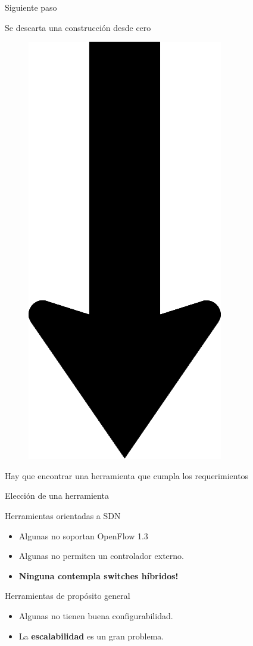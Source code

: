 \documentclass[xcolor=svgnames]{beamer}
\begin{document}
\begin{frame}{Siguiente paso}
	\begin{center}
		Se descarta una construcción desde cero
	\begin{figure}[t]
		\includegraphics[scale=0.1]{arrow_down}
	\end{figure}
	Hay que encontrar una herramienta que cumpla los requerimientos
	\end{center}
\end{frame}

\begin{frame}{Elección de una herramienta}
	\begin{alertblock}{Herramientas orientadas a SDN}
		\begin{itemize}
			\item Algunas no soportan OpenFlow 1.3
			\item Algunas no permiten un controlador externo.
			\item \textbf{Ninguna contempla switches híbridos!}
		\end{itemize}
	\end{alertblock}
	\pause
	\begin{block}{Herramientas de propósito general}
		\begin{itemize}
			\item Algunas no tienen buena configurabilidad.
			\item La \textbf{escalabilidad} es un gran problema.
		\end{itemize}
	\end{block}
\end{frame}
\end{document}

